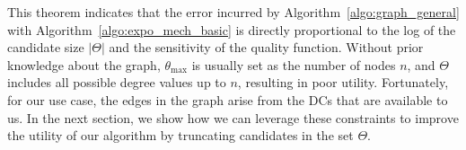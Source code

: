 \fi

This theorem indicates that the error incurred by Algorithm~\ref{algo:graph_general} with Algorithm~\ref{algo:expo_mech_basic} is directly proportional to the log of the candidate size $|\Theta|$ and the sensitivity of the quality function.  Without prior knowledge about the graph, $\theta_{\max}$ is usually set as the number of nodes $n$, and $\Theta$ includes all possible degree values up to $n$, resulting in poor utility. 
Fortunately, for our use case, the edges in the graph arise from the DCs that are available to us. In the next section, we show how we can leverage these constraints to improve the utility of our algorithm by truncating candidates in the set $\Theta$.





